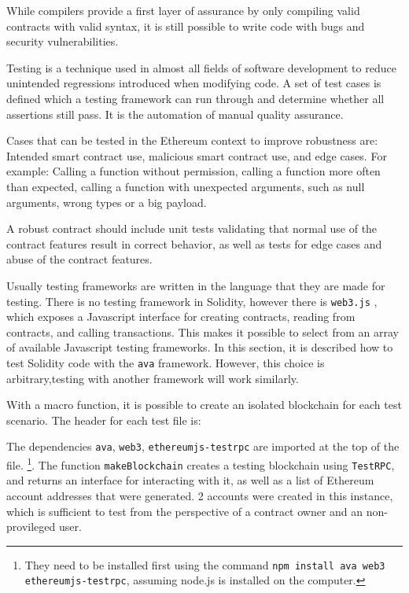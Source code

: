 While compilers provide a first layer of assurance by only compiling valid contracts with valid syntax, it is still possible to write code with bugs and security vulnerabilities.

Testing is a technique used in almost all fields of software development to reduce unintended regressions introduced when modifying code. A set of test cases is defined which a testing framework can run through and determine whether all assertions still pass. It is the automation of manual quality assurance.

Cases that can be tested in the Ethereum context to improve robustness are: Intended smart contract use, malicious smart contract use, and edge cases. For example: Calling a function without permission, calling a function more often than expected, calling a function with unexpected arguments, such as null arguments, wrong types or a big payload.

A robust contract should include unit tests validating that normal use of the contract features result in correct behavior, as well as tests for edge cases and abuse of the contract features.

Usually testing frameworks are written in the language that they are made for testing. There is no testing framework in  Solidity, however there is \texttt{web3.js} \cite{web3}, which exposes a Javascript interface for creating contracts, reading from contracts, and calling transactions. This makes it possible to select from an array of available Javascript testing frameworks. In this section, it is described how to test Solidity code with the \texttt{ava} framework. However, this choice is arbitrary,testing with another framework will work similarly.

With a macro function, it is possible to create an isolated blockchain for each test scenario. The header for each test file is:



The dependencies \texttt{ava}, \texttt{web3}, \texttt{ethereumjs-testrpc} are imported at the top of the file. \footnote{They need to be installed first using the command \texttt{npm install ava web3 ethereumjs-testrpc}, assuming node.js is installed on the computer.}. The function \texttt{makeBlockchain} creates a testing blockchain using \texttt{TestRPC}, and returns an interface for interacting with it, as well as a list of Ethereum account addresses that were generated. 2 accounts were created in this instance, which is sufficient to test from the perspective of a contract owner and an non-provileged user.

